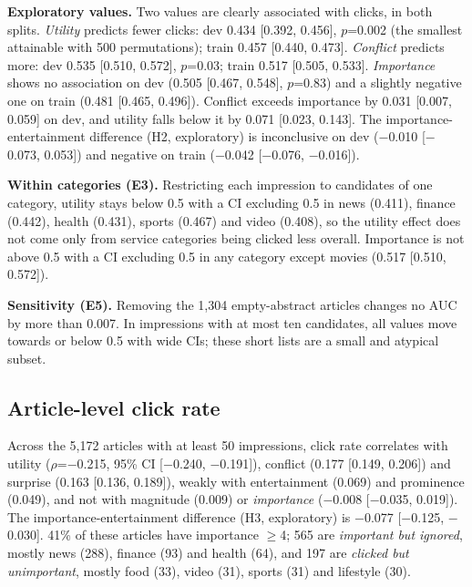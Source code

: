 \textbf{Exploratory values.} Two values are clearly associated with clicks, in both splits. \emph{Utility} predicts fewer clicks: dev 0.434 [0.392, 0.456], $p$=0.002 (the smallest attainable with 500 permutations); train 0.457 [0.440, 0.473]. \emph{Conflict} predicts more: dev 0.535 [0.510, 0.572], $p$=0.03; train 0.517 [0.505, 0.533]. \emph{Importance} shows no association on dev (0.505 [0.467, 0.548], $p$=0.83) and a slightly negative one on train (0.481 [0.465, 0.496]). Conflict exceeds importance by 0.031 [0.007, 0.059] on dev, and utility falls below it by 0.071 [0.023, 0.143]. The importance-entertainment difference (H2, exploratory) is inconclusive on dev ($-$0.010 [$-$0.073, 0.053]) and negative on train ($-$0.042 [$-$0.076, $-$0.016]).

\textbf{Within categories (E3).} Restricting each impression to candidates of one category, utility stays below 0.5 with a CI excluding 0.5 in news (0.411), finance (0.442), health (0.431), sports (0.467) and video (0.408), so the utility effect does not come only from service categories being clicked less overall. Importance is not above 0.5 with a CI excluding 0.5 in any category except movies (0.517 [0.510, 0.572]).

\textbf{Sensitivity (E5).} Removing the 1,304 empty-abstract articles changes no AUC by more than 0.007. In impressions with at most ten candidates, all values move towards or below 0.5 with wide CIs; these short lists are a small and atypical subset.

\subsection{Article-level click rate}
Across the 5,172 articles with at least 50 impressions, click rate correlates with utility ($\rho$=$-$0.215, 95\% CI [$-$0.240, $-$0.191]), conflict (0.177 [0.149, 0.206]) and surprise (0.163 [0.136, 0.189]), weakly with entertainment (0.069) and prominence (0.049), and not with magnitude (0.009) or \emph{importance} ($-$0.008 [$-$0.035, 0.019]). The importance-entertainment difference (H3, exploratory) is $-$0.077 [$-$0.125, $-$0.030]. 41\% of these articles have importance $\ge$4; 565 are \emph{important but ignored}, mostly news (288), finance (93) and health (64), and 197 are \emph{clicked but unimportant}, mostly food (33), video (31), sports (31) and lifestyle (30).

